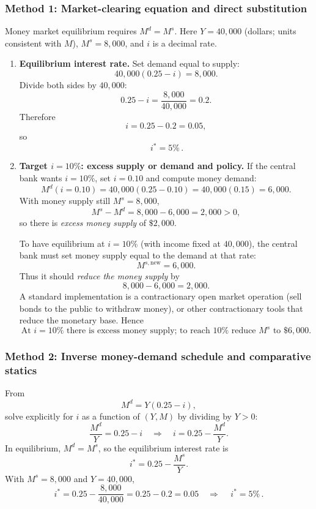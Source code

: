 \documentclass[12pt]{article}
\begin{document}
\subsubsection*{Method 1: Market-clearing equation and direct substitution}
Money market equilibrium requires \(M^d=M^s\). Here \(Y=40{,}000\) (dollars; units consistent with \(M\)), \(M^s=8{,}000\), and \(i\) is a decimal rate.

\begin{enumerate}[label=(\alph*)]
\item \textbf{Equilibrium interest rate.}
Set demand equal to supply:
\[
40{,}000(0.25-i) = 8{,}000.
\]
Divide both sides by \(40{,}000\):
\[
0.25 - i = \frac{8{,}000}{40{,}000}=0.2.
\]
Therefore
\[
i = 0.25 - 0.2 = 0.05,
\]
so
\[
\boxed{\,i^* = 5\%\, }.
\]

\item \textbf{Target \(i=10\%\): excess supply or demand and policy.}
If the central bank wants \(i=10\%\), set \(i=0.10\) and compute money demand:
\[
M^d(i=0.10)=40{,}000(0.25-0.10)=40{,}000(0.15)=6{,}000.
\]
With money supply still \(M^s=8{,}000\),
\[
M^s - M^d = 8{,}000-6{,}000=2{,}000>0,
\]
so there is \emph{excess money supply} of \(\$2{,}000\).

To have equilibrium at \(i=10\%\) (with income fixed at \(40{,}000\)), the central bank must set money supply equal to the demand at that rate:
\[
M^{s,\text{new}} = 6{,}000.
\]
Thus it should \emph{reduce the money supply} by
\[
8{,}000-6{,}000=2{,}000.
\]
A standard implementation is a contractionary open market operation (sell bonds to the public to withdraw money), or other contractionary tools that reduce the monetary base.
Hence
\[
\boxed{\,\text{At }i=10\%\text{ there is excess money supply; to reach }10\%\text{ reduce }M^s\text{ to }\$6{,}000.\,}
\]
\end{enumerate}

\subsubsection*{Method 2: Inverse money-demand schedule and comparative statics}
From
\[
M^d = Y(0.25-i),
\]
solve explicitly for \(i\) as a function of \((Y,M)\) by dividing by \(Y>0\):
\[
\frac{M^d}{Y}=0.25-i
\quad\Longrightarrow\quad
i = 0.25-\frac{M^d}{Y}.
\]
In equilibrium, \(M^d=M^s\), so the equilibrium interest rate is
\[
i^* = 0.25-\frac{M^s}{Y}.
\]
With \(M^s=8{,}000\) and \(Y=40{,}000\),
\[
i^* = 0.25 - \frac{8{,}000}{40{,}000}
=0.25-0.2
=0.05
\quad\Rightarrow\quad
\boxed{\,i^*=5\%\, }.
\]
\end{document}
